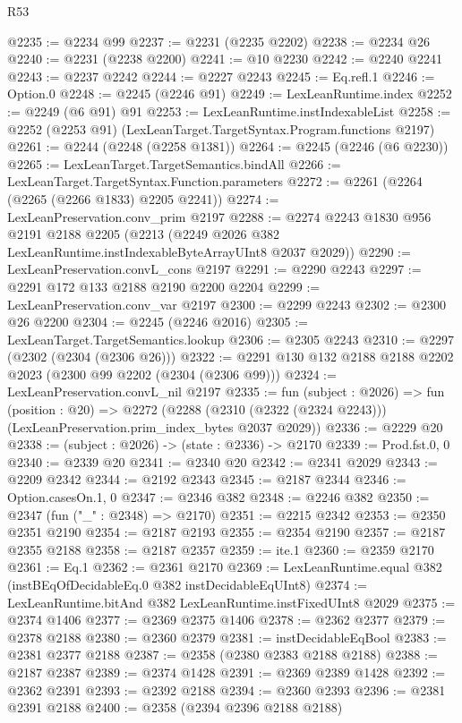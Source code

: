 \begin{lexlean}{R53}
\begin{coremodule}
@2235 := @2234 @99
@2237 := @2231 (@2235 @2202)
@2238 := @2234 @26
@2240 := @2231 (@2238 @2200)
@2241 := @10 @2230
@2242 := @2240 @2241
@2243 := @2237 @2242
@2244 := @2227 @2243
@2245 := Eq.refl.{1}
@2246 := Option.{0}
@2248 := @2245 (@2246 @91)
@2249 := LexLeanRuntime.index
@2252 := @2249 (@6 @91) @91
@2253 := LexLeanRuntime.instIndexableList
@2258 := @2252 (@2253 @91) (LexLeanTarget.TargetSyntax.Program.functions @2197)
@2261 := @2244 (@2248 (@2258 @1381))
@2264 := @2245 (@2246 (@6 @2230))
@2265 := LexLeanTarget.TargetSemantics.bindAll
@2266 := LexLeanTarget.TargetSyntax.Function.parameters
@2272 := @2261 (@2264 (@2265 (@2266 @1833) @2205 @2241))
@2274 := LexLeanPreservation.conv_prim @2197
@2288 := @2274
    @2243
    @1830
    @956
    @2191
    @2188
    @2205
    (@2213 (@2249 @2026 @382 LexLeanRuntime.instIndexableByteArrayUInt8 @2037 @2029))
@2290 := LexLeanPreservation.convL_cons @2197
@2291 := @2290 @2243
@2297 := @2291 @172 @133 @2188 @2190 @2200 @2204
@2299 := LexLeanPreservation.conv_var @2197
@2300 := @2299 @2243
@2302 := @2300 @26 @2200
@2304 := @2245 (@2246 @2016)
@2305 := LexLeanTarget.TargetSemantics.lookup
@2306 := @2305 @2243
@2310 := @2297 (@2302 (@2304 (@2306 @26)))
@2322 := @2291 @130 @132 @2188 @2188 @2202 @2023 (@2300 @99 @2202 (@2304 (@2306 @99)))
@2324 := LexLeanPreservation.convL_nil @2197
@2335 := fun (subject : @2026) =>
  fun (position : @20) =>
  @2272 (@2288 (@2310 (@2322 (@2324 @2243))) (LexLeanPreservation.prim_index_bytes @2037 @2029))
@2336 := @2229 @20
@2338 := (subject : @2026) -> (state : @2336) -> @2170
@2339 := Prod.fst.{0, 0}
@2340 := @2339 @20
@2341 := @2340 @20
@2342 := @2341 @2029
@2343 := @2209 @2342
@2344 := @2192 @2343
@2345 := @2187 @2344
@2346 := Option.casesOn.{1, 0}
@2347 := @2346 @382
@2348 := @2246 @382
@2350 := @2347 (fun ("_" : @2348) => @2170)
@2351 := @2215 @2342
@2353 := @2350 @2351 @2190
@2354 := @2187 @2193
@2355 := @2354 @2190
@2357 := @2187 @2355 @2188
@2358 := @2187 @2357
@2359 := ite.{1}
@2360 := @2359 @2170
@2361 := Eq.{1}
@2362 := @2361 @2170
@2369 := LexLeanRuntime.equal @382 (instBEqOfDecidableEq.{0} @382 instDecidableEqUInt8)
@2374 := LexLeanRuntime.bitAnd @382 LexLeanRuntime.instFixedUInt8 @2029
@2375 := @2374 @1406
@2377 := @2369 @2375 @1406
@2378 := @2362 @2377
@2379 := @2378 @2188
@2380 := @2360 @2379
@2381 := instDecidableEqBool
@2383 := @2381 @2377 @2188
@2387 := @2358 (@2380 @2383 @2188 @2188)
@2388 := @2187 @2387
@2389 := @2374 @1428
@2391 := @2369 @2389 @1428
@2392 := @2362 @2391
@2393 := @2392 @2188
@2394 := @2360 @2393
@2396 := @2381 @2391 @2188
@2400 := @2358 (@2394 @2396 @2188 @2188)

\end{coremodule}
\end{lexlean}
